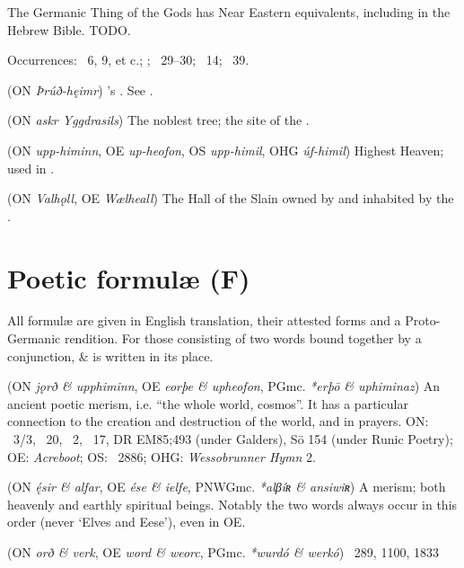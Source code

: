 \begin{itemize}
  The Germanic Thing of the Gods has Near Eastern equivalents, including in the Hebrew Bible.  TODO.

  Occurrences: \Voluspa\ 6, 9, et c.; ; \Grimnismal\ 29–30; \Thrymskvida\ 14; \Hymiskvida\ 39.

 (ON \emph{Þrúð-hęimr})
  ’s .  See .

 (ON \emph{askr Yggdrasils})
  The noblest tree; the site of the .

 (ON \emph{upp-himinn}, OE \emph{up-heofon}, OS \emph{upp-himil}, OHG \emph{úf-himil})
  Highest Heaven; used in .

 (ON \emph{Valhǫll}, OE \emph{Wælheall})
  The Hall of the Slain owned by  and inhabited by the .
\end{itemize}

\section{Poetic formulæ (F)}
All formulæ are given in English translation, their attested forms and a Proto-Germanic rendition. For those consisting of two words bound together by a conjunction, \& is written in its place.

\begin{itemize}
 (ON \emph{jǫrð \& upphiminn}, OE \emph{eorþe \& upheofon}, PGmc. \emph{*erþō \& uphiminaz})
  An ancient poetic merism, i.e. “the whole world, cosmos”. It has a particular connection to the creation and destruction of the world, and in prayers.
  ON: \Voluspa\ 3/3, \Vafthrudnismal\ 20, \Thrymskvida\ 2, \Oddrunargratr\ 17, DR EM85;493 (under Galders), Sö 154 (under Runic Poetry);
  OE: \emph{Acreboot};
  OS: \Heliand\ 2886;
  OHG: \emph{Wessobrunner Hymn} 2.

 (ON \emph{ę́sir \& alfar}, OE \emph{ése \& ielfe}, PNWGmc. \emph{*alβíʀ \& ansiwiʀ})
  A merism; both heavenly and earthly spiritual beings.  Notably the two words always occur in this order (never ‘Elves and Eese’), even in OE.

 (ON \emph{orð \& verk}, OE \emph{word \& weorc}, PGmc. \emph{*wurdó \& werkó})
  \Beowulf\ 289, 1100, 1833

\end{itemize}
